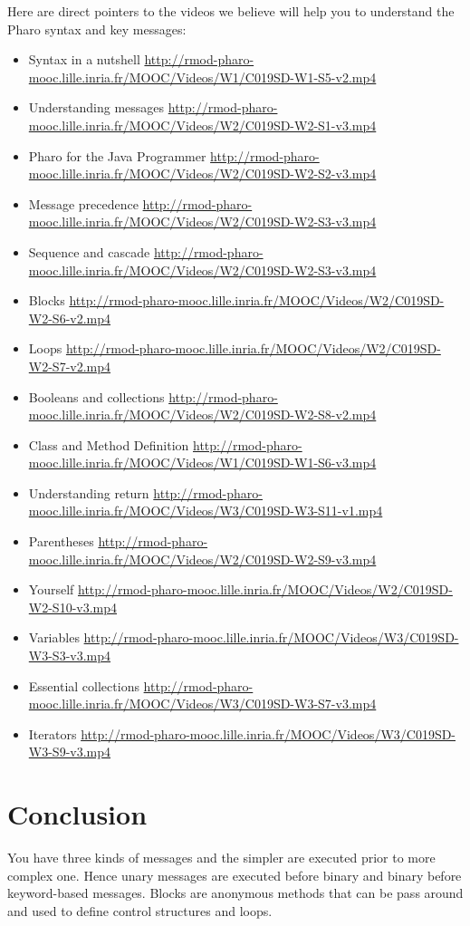 \documentclass[10pt,twoside,english]{_support/latex/sbabook/sbabook}
\begin{document}
Here are direct pointers to the videos we believe will help you to understand the Pharo syntax and key messages: 

\begin{itemize}
\item Syntax in a nutshell \url{http://rmod-pharo-mooc.lille.inria.fr/MOOC/Videos/W1/C019SD-W1-S5-v2.mp4}
\item Understanding messages \url{http://rmod-pharo-mooc.lille.inria.fr/MOOC/Videos/W2/C019SD-W2-S1-v3.mp4}
\item Pharo for the Java Programmer \url{http://rmod-pharo-mooc.lille.inria.fr/MOOC/Videos/W2/C019SD-W2-S2-v3.mp4}
\item Message precedence \url{http://rmod-pharo-mooc.lille.inria.fr/MOOC/Videos/W2/C019SD-W2-S3-v3.mp4}
\item Sequence and cascade \url{http://rmod-pharo-mooc.lille.inria.fr/MOOC/Videos/W2/C019SD-W2-S3-v3.mp4}
\item Blocks \url{http://rmod-pharo-mooc.lille.inria.fr/MOOC/Videos/W2/C019SD-W2-S6-v2.mp4}
\item Loops \url{http://rmod-pharo-mooc.lille.inria.fr/MOOC/Videos/W2/C019SD-W2-S7-v2.mp4}
\item Booleans and collections \url{http://rmod-pharo-mooc.lille.inria.fr/MOOC/Videos/W2/C019SD-W2-S8-v2.mp4}
\item Class and Method Definition \url{http://rmod-pharo-mooc.lille.inria.fr/MOOC/Videos/W1/C019SD-W1-S6-v3.mp4}
\item Understanding return \url{http://rmod-pharo-mooc.lille.inria.fr/MOOC/Videos/W3/C019SD-W3-S11-v1.mp4}
\item Parentheses \url{http://rmod-pharo-mooc.lille.inria.fr/MOOC/Videos/W2/C019SD-W2-S9-v3.mp4}
\item Yourself \url{http://rmod-pharo-mooc.lille.inria.fr/MOOC/Videos/W2/C019SD-W2-S10-v3.mp4}
\item Variables \url{http://rmod-pharo-mooc.lille.inria.fr/MOOC/Videos/W3/C019SD-W3-S3-v3.mp4}
\item Essential collections \url{http://rmod-pharo-mooc.lille.inria.fr/MOOC/Videos/W3/C019SD-W3-S7-v3.mp4} 
\item Iterators \url{http://rmod-pharo-mooc.lille.inria.fr/MOOC/Videos/W3/C019SD-W3-S9-v3.mp4}
\end{itemize}
\section{Conclusion }
You have three kinds of messages and the simpler are executed prior to more complex one. Hence unary messages are executed before binary and binary before keyword-based messages. 
Blocks are anonymous methods that can be pass around and used to define control structures and loops.
\end{document}
